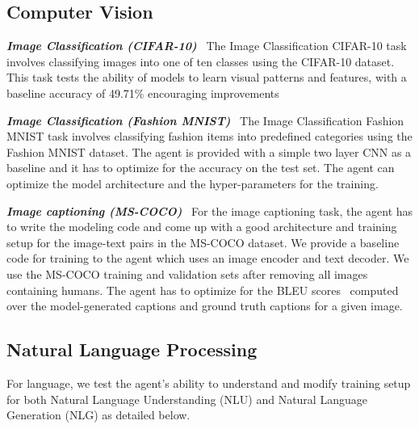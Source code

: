 \documentclass[]{fairmeta}
\newcommand{\ibold}[1]{\textbf{\textit{#1}}}
\newcommand{\dn}[1]{\colorbox{magenta}{\textcolor{white}{Deepak}}\textcolor{magenta}{\textbf{:#1}}}
\begin{document}
\subsection{Computer Vision}

\ibold{Image Classification (CIFAR-10)}~\citep{krizhevsky2009learning} The Image Classification CIFAR-10 task involves classifying images into one of ten classes using the CIFAR-10 dataset.
This task tests the ability of models to learn visual patterns and features, with a baseline accuracy of 49.71\% encouraging improvements 

\ibold{Image Classification (Fashion MNIST)}~\citep{xiao2017/online} The Image Classification Fashion MNIST task involves classifying fashion items into predefined categories using the Fashion MNIST dataset. The agent is provided with a simple two layer CNN as a baseline and it has to optimize for the accuracy on the test set. The agent can optimize the model architecture and the hyper-parameters for the training.


\ibold{Image captioning (MS-COCO)}~\citep{lin2014microsoft} For the image captioning task, the agent has to write the modeling code and come up with a good architecture and training setup for the image-text pairs in the MS-COCO dataset. We provide a baseline code for training to the agent which uses an image encoder and text decoder. We use the MS-COCO training and validation sets after removing all images containing humans. The agent has to optimize for the BLEU scores~\citep{papineni2002bleu} computed over the model-generated captions and ground truth captions for a given image.


\subsection{Natural Language Processing}

For language, we test the agent's ability to understand and modify training setup for both Natural Language Understanding (NLU) and Natural Language Generation (NLG) as detailed below.
\end{document}
